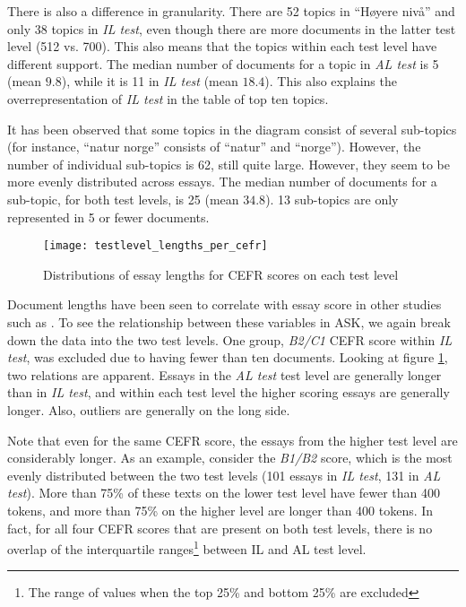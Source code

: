 There is also a difference in granularity. There are 52 topics in ``Høyere
nivå'' and only 38 topics in \emph{IL test}, even though there are more
documents in the latter test level (512 vs. 700). This also means that the
topics within each test level have different support. The median number of
documents for a topic in \emph{AL test} is 5 (mean $9.8$), while it is 11 in
\emph{IL test} (mean $18.4$). This also explains the overrepresentation of
\emph{IL test} in the table of top ten topics.

It has been observed that some topics in the diagram consist of several
sub-topics (for instance, ``natur norge'' consists of ``natur'' and
``norge''). However, the number of individual sub-topics is 62, still quite
large. However, they seem to be more evenly distributed across essays. The
median number of documents for a sub-topic, for both test levels, is 25 (mean
$34.8$). 13 sub-topics are only represented in 5 or fewer documents.

\begin{figure}
  \centering
  \texttt{[image: testlevel\_lengths\_per\_cefr]}
  \caption{Distributions of essay lengths for CEFR scores on each test level}
  \label{fig:testlevel-lengths-per-cefr}
\end{figure}

Document lengths have been seen to correlate with essay score in other
studies such as \textcite{vajjala17}. To see the relationship between these
variables in ASK, we again break down the data into the two test levels. One
group, \emph{B2/C1} CEFR score within \emph{IL test}, was excluded due to
having fewer than ten documents. Looking at figure
\ref{fig:testlevel-lengths-per-cefr}, two relations are apparent. Essays in
the \emph{AL test} test level are generally longer than in \emph{IL test},
and within each test level the higher scoring essays are generally longer.
Also, outliers are generally on the long side.

Note that even for the same CEFR score, the essays from the higher test level
are considerably longer. As an example, consider the \emph{B1/B2} score,
which is the most evenly distributed between the two test levels (101 essays
in \emph{IL test}, 131 in \emph{AL test}). More than 75\% of these texts on
the lower test level have fewer than 400 tokens, and more than 75\% on the
higher level are longer than 400 tokens. In fact, for all four CEFR scores
that are present on both test levels, there is no overlap of the
interquartile ranges\footnote{The range of values when the top 25\% and
bottom 25\% are excluded} between IL and AL test level.


